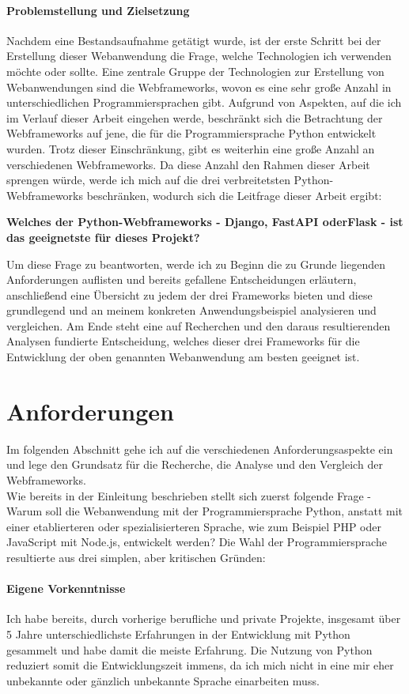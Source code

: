 \documentclass[letterpaper,11pt,leqno]{article}
\begin{document}
\paragraph{Problemstellung und Zielsetzung}
Nachdem eine Bestandsaufnahme getätigt wurde, ist der erste Schritt bei der Erstellung dieser
Webanwendung die Frage, welche Technologien ich verwenden möchte oder sollte. Eine zentrale Gruppe
der Technologien zur Erstellung von Webanwendungen sind die Webframeworks, wovon es eine sehr große
Anzahl in unterschiedlichen Programmiersprachen gibt. Aufgrund von Aspekten, auf die ich im Verlauf
dieser Arbeit eingehen werde, beschränkt sich die Betrachtung der Webframeworks auf jene, die für
die Programmiersprache Python entwickelt wurden. Trotz dieser Einschränkung, gibt es weiterhin eine
große Anzahl an verschiedenen Webframeworks. Da diese Anzahl den Rahmen dieser Arbeit sprengen
würde, werde ich mich auf die drei verbreitetsten Python-Webframeworks beschränken, wodurch sich die
Leitfrage dieser Arbeit ergibt:\begin{center}\textbf{Welches der Python-Webframeworks - Django,
FastAPI oderFlask - ist das geeignetste für dieses Projekt?}\end{center}Um diese Frage zu
beantworten, werde ich zu Beginn die zu Grunde liegenden Anforderungen auflisten und bereits
gefallene Entscheidungen erläutern, anschließend eine Übersicht zu jedem der drei Frameworks bieten
und diese grundlegend und an meinem konkreten Anwendungsbeispiel analysieren und vergleichen. Am
Ende steht eine auf Recherchen und den daraus resultierenden Analysen fundierte Entscheidung,
welches dieser drei Frameworks für die Entwicklung der oben genannten Webanwendung am besten
geeignet ist.

\section{Anforderungen}\label{s:anforderungen}
Im folgenden Abschnitt gehe ich auf die verschiedenen Anforderungsaspekte ein und lege den Grundsatz
für die Recherche, die Analyse und den Vergleich der Webframeworks.\\Wie bereits in der Einleitung
beschrieben stellt sich zuerst folgende Frage - Warum soll die Webanwendung mit der
Programmiersprache Python, anstatt mit einer etablierteren oder spezialisierteren Sprache, wie zum
Beispiel PHP oder JavaScript mit Node.js, entwickelt werden? Die Wahl der Programmiersprache
resultierte aus drei simplen, aber kritischen Gründen:
\paragraph{Eigene Vorkenntnisse}Ich habe bereits, durch vorherige berufliche und private Projekte,
insgesamt über 5 Jahre unterschiedlichste Erfahrungen in der Entwicklung mit Python gesammelt und
habe damit die meiste Erfahrung. Die Nutzung von Python reduziert somit die Entwicklungszeit immens,
da ich mich nicht in eine mir eher unbekannte oder gänzlich unbekannte Sprache einarbeiten muss.
\end{document}
